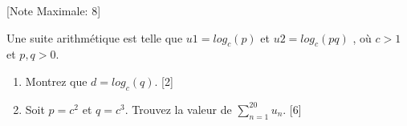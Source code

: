 \begin{question}
  \hspace*{\fill} [Note Maximale: 8]\par
  \noindent Une suite arithmétique est telle que $u1 = log_c(p)$ et $u2 = log_c(pq)$ , où $c > 1$ et $p, q > 0$.\par
  \begin{enumerate}[label=(\alph*)]
    \item Montrez que $d = log_c(q)$.\hspace*{\fill} [2]
    \item Soit $p = c^2$ et $q = c^3$. Trouvez la valeur de $\sum_{n=1}^{20} u_n$.\hspace*{\fill} [6]
  \end{enumerate}
\end{question}
